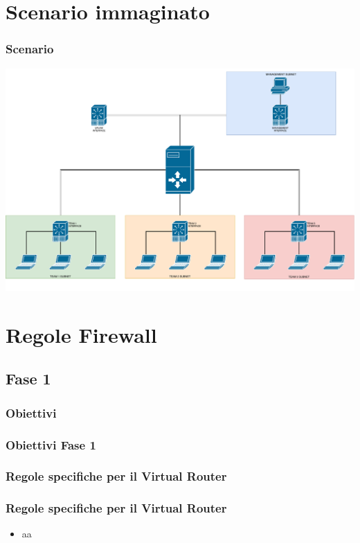\documentclass{beamer}
\begin{document}
\section{Scenario immaginato}

\begin{frame}
    \frametitle{Scenario}

    \includegraphics[width=\textwidth]{competition.pdf}

\end{frame}

\section{Regole Firewall}




\subsection{Fase 1}
\subsubsection{Obiettivi}
\begin{frame}
    \frametitle{Obiettivi Fase 1}


\end{frame}

\subsubsection{Regole specifiche per il Virtual Router}
\begin{frame}
    \frametitle{Regole specifiche per il Virtual Router}
    \begin{itemize}
        \item aa
    \end{itemize}
\end{frame}
\end{document}
